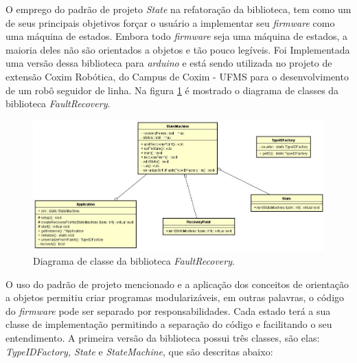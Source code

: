 O emprego do padrão de projeto \textit{State} na refatoração da biblioteca, tem como um de seus principais objetivos forçar o usuário a implementar seu \textit{firmware} como uma máquina de estados. Embora todo \textit{firmware} seja uma máquina de estados, a maioria deles não são orientados a objetos e tão pouco legíveis. Foi Implementada uma versão dessa biblioteca para \textit{arduino} e está sendo utilizada no projeto de extensão Coxim Robótica, do Campus de Coxim - UFMS para o desenvolvimento de um robô seguidor de linha. Na figura \ref{Img:diagramaFaultRecovery} é mostrado o diagrama de classes da biblioteca \textit{FaultRecovery}.

\begin{figure}[H]
	\centering
	\includegraphics[width=1.0\textwidth]{figuras/diagramaFaultRecovery.jpg}
	\caption[Diagrama de classes da biblioteca \textit{FaultRecovery}.]{Diagrama de classe da biblioteca \textit{FaultRecovery}.}
	\label{Img:diagramaFaultRecovery}	
\end{figure}

O uso do padrão de projeto mencionado e a aplicação dos conceitos de orientação a objetos permitiu criar programas modularizáveis, em outras palavras, o código do \textit{firmware} pode ser separado por responsabilidades. Cada estado terá a sua classe de implementação permitindo a separação do código e facilitando o seu entendimento. A primeira versão da biblioteca possui três classes, são elas: \textit{TypeIDFactory, State} e \textit{StateMachine}, que são descritas abaixo:


